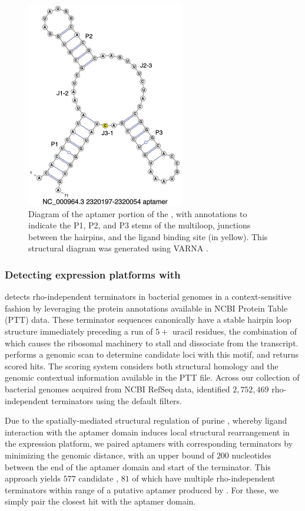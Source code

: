 \begin{figure}[!ht]
\centering
\includegraphics[width=.4\textwidth]{Figures/Ribofinder/NC_000964_3_2320197_2320054_APTAMER.pdf}
\caption[Diagram of the aptamer portion of the \Bsxpt \grb]{Diagram of the aptamer portion of the \Bsxpt \grb, with annotations
to indicate the P1, P2, and P3 stems of the multiloop, junctions between the
hairpins, and the ligand binding site (in yellow). This structural diagram was
generated using VARNA \citep{darty:2009gt}.}
\label{fig:rfinder:aptamerDiagram}
\end{figure}

\subsubsection{Detecting expression platforms with \tthp}
\label{subsubsec:rfinder:tthp}

\tthp \citep{ermolaeva:2000cl} detects rho-independent terminators in bacterial
genomes in a context-sensitive fashion by leveraging the protein annotations
available in NCBI Protein Table (PTT) data. These terminator sequences canonically have a stable
hairpin loop structure immediately preceding a run of $5+$ uracil residues, the
combination of which causes the ribosomal machinery to stall and dissociate from
the transcript. \tthp performs a genomic scan to determine candidate loci with
this motif, and returns scored hits. The scoring system considers both structural
homology and the genomic contextual information available in the PTT file. Across
our collection of bacterial genomes acquired from NCBI RefSeq data, \tthp
identified $2,752,469$ rho-independent terminators using the default filters.

Due to the spatially-mediated structural regulation of purine \rbs,
whereby ligand interaction with the aptamer domain induces local structural
rearrangement in the expression platform, we paired aptamers with corresponding
terminators by minimizing the genomic distance, with an upper bound of $200$
nucleotides between the end of the aptamer domain and start of the terminator.
This approach yields $577$ candidate \rbs, $81$ of which have multiple
rho-independent terminators within range of a putative aptamer produced by
\infernal. For these, we simply pair the closest \tthp hit with the aptamer domain.

